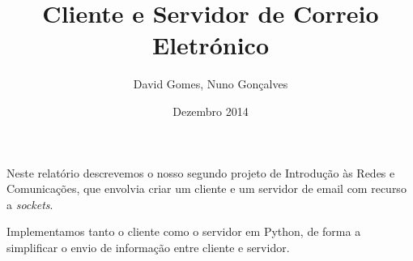 \documentclass[12pt]{article}
\title{Cliente e Servidor de Correio Eletrónico}
\author{David Gomes, Nuno Gonçalves}
\date{Dezembro 2014}
\begin{document}
\maketitle

Neste relatório descrevemos o nosso segundo projeto de Introdução às Redes
e Comunicações, que envolvia criar um cliente e um servidor de email com
recurso a \textit{sockets}.

Implementamos tanto o cliente como o servidor em Python, de forma a simplificar
o envio de informação entre cliente e servidor.
\end{document}
